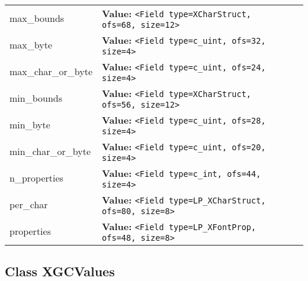 \begin{longtable}{|p{\varnamewidth}|p{\vardescrwidth}|l}
\cline{1-2}
\raggedright m\-a\-x\-\_\-b\-o\-u\-n\-d\-s\- & \raggedright \textbf{Value:} 
{\tt {\textless}Field type=XCharStruct, ofs=68, size=12{\textgreater}}&\\
\cline{1-2}
\raggedright m\-a\-x\-\_\-b\-y\-t\-e\-1\- & \raggedright \textbf{Value:} 
{\tt {\textless}Field type=c\_uint, ofs=32, size=4{\textgreater}}&\\
\cline{1-2}
\raggedright m\-a\-x\-\_\-c\-h\-a\-r\-\_\-o\-r\-\_\-b\-y\-t\-e\-2\- & \raggedright \textbf{Value:} 
{\tt {\textless}Field type=c\_uint, ofs=24, size=4{\textgreater}}&\\
\cline{1-2}
\raggedright m\-i\-n\-\_\-b\-o\-u\-n\-d\-s\- & \raggedright \textbf{Value:} 
{\tt {\textless}Field type=XCharStruct, ofs=56, size=12{\textgreater}}&\\
\cline{1-2}
\raggedright m\-i\-n\-\_\-b\-y\-t\-e\-1\- & \raggedright \textbf{Value:} 
{\tt {\textless}Field type=c\_uint, ofs=28, size=4{\textgreater}}&\\
\cline{1-2}
\raggedright m\-i\-n\-\_\-c\-h\-a\-r\-\_\-o\-r\-\_\-b\-y\-t\-e\-2\- & \raggedright \textbf{Value:} 
{\tt {\textless}Field type=c\_uint, ofs=20, size=4{\textgreater}}&\\
\cline{1-2}
\raggedright n\-\_\-p\-r\-o\-p\-e\-r\-t\-i\-e\-s\- & \raggedright \textbf{Value:} 
{\tt {\textless}Field type=c\_int, ofs=44, size=4{\textgreater}}&\\
\cline{1-2}
\raggedright p\-e\-r\-\_\-c\-h\-a\-r\- & \raggedright \textbf{Value:} 
{\tt {\textless}Field type=LP\_XCharStruct, ofs=80, size=8{\textgreater}}&\\
\cline{1-2}
\raggedright p\-r\-o\-p\-e\-r\-t\-i\-e\-s\- & \raggedright \textbf{Value:} 
{\tt {\textless}Field type=LP\_XFontProp, ofs=48, size=8{\textgreater}}&\\
\cline{1-2}
\end{longtable}



\subsection{Class XGCValues}

